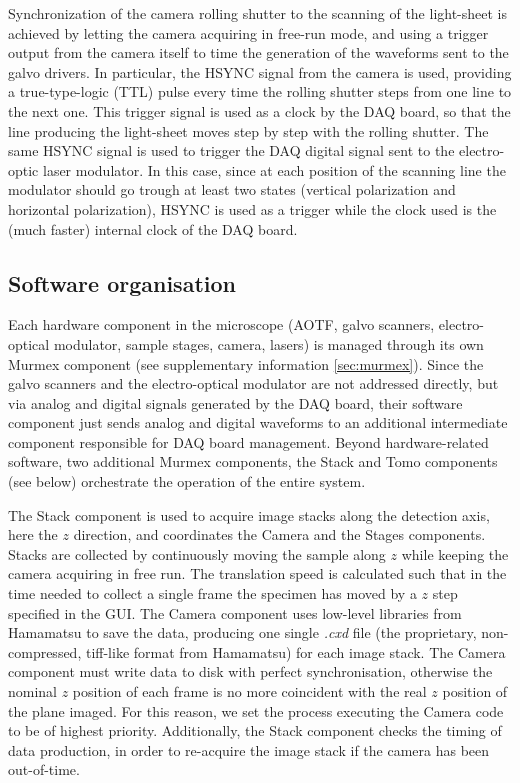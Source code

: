 \documentclass[12pt]{spieman}  %
\begin{document}
Synchronization of the camera rolling shutter to the scanning of the light-sheet is achieved by letting the camera acquiring in free-run mode, and using a trigger output from the camera itself to time the generation of the waveforms sent to the galvo drivers. In particular, the HSYNC signal from the camera is used, providing a true-type-logic (TTL) pulse every time the rolling shutter steps from one line to the next one. This trigger signal is used as a clock by the DAQ board, so that the line producing the light-sheet moves step by step with the rolling shutter. The same HSYNC signal is used to trigger the DAQ digital signal sent to the electro-optic laser modulator. In this case, since at each position of the scanning line the modulator should go trough at least two states (vertical polarization and horizontal polarization), HSYNC is used as a trigger while the clock used is the (much faster) internal clock of the DAQ board.




\subsection{Software organisation}
Each hardware component in the microscope (AOTF, galvo scanners, electro-optical modulator, sample stages, camera, lasers) is managed through its own Murmex component (see supplementary information \ref{sec:murmex}). Since the galvo scanners and the electro-optical modulator are not addressed directly, but via analog and digital signals generated by the DAQ board, their software component just sends analog and digital waveforms to an additional intermediate component responsible for DAQ board management. Beyond hardware-related software, two additional Murmex components, the Stack and Tomo components (see below) orchestrate the operation of the entire system. 

The Stack component is used to acquire image stacks along the detection axis, here the $z$ direction, and coordinates the Camera and the Stages components. Stacks are collected by continuously moving the sample along $z$ while keeping the camera acquiring in free run. The translation speed is calculated such that in the time needed to collect a single frame the specimen has moved by a $z$ step specified in the GUI. The Camera component uses low-level libraries from Hamamatsu to save the data, producing one single \emph{.cxd} file (the proprietary, non-compressed, tiff-like format from Hamamatsu) for each image stack. The Camera component must write data to disk with perfect synchronisation, otherwise the nominal $z$ position of each frame is no more coincident with the real $z$ position of the plane imaged. For this reason, we set the process executing the Camera code to be of highest priority. Additionally, the Stack component checks the timing of data production, in order to re-acquire the image stack if the camera has been out-of-time. %
\end{document}
